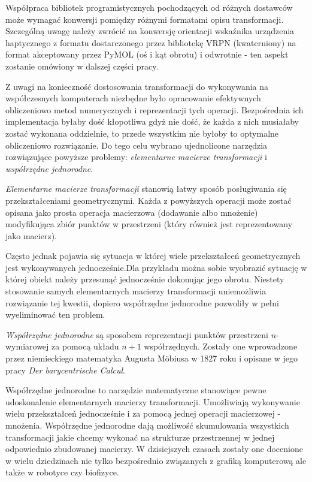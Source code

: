 \documentclass[licencjacka]{pracamgr}
\begin{document}
Współpraca bibliotek programistycznych pochodzących od różnych dostawców może wymagać konwersji pomiędzy różnymi formatami opisu transformacji. Szczególną uwagę należy zwrócić na konwersję orientacji wskaźnika urządzenia haptycznego z formatu dostarczonego przez bibliotekę VRPN (kwaterniony) na format akceptowany przez PyMOL (oś i kąt obrotu) i odwrotnie - ten aspekt zostanie omówiony w dalszej części pracy.

Z uwagi na konieczność dostosowania transformacji do wykonywania na współczesnych komputerach niezbędne było opracowanie efektywnych obliczeniowo metod numerycznych i reprezentacji tych operacji. Bezpośrednia ich implementacja byłaby dość kłopotliwa gdyż nie dość, że każda z nich musiałaby zostać wykonana oddzielnie, to przede wszystkim nie byłoby to optymalne obliczeniowo rozwiązanie. Do tego celu wybrano ujednolicone narzędzia rozwiązujące powyższe problemy: \textit{elementarne macierze transformacji} i \textit{współrzędne jednorodne}.

\textit{Elementarne macierze transformacji} stanowią łatwy sposób posługiwania się przekształceniami geometrycznymi. Każda z powyższych operacji może zostać opisana jako prosta operacja macierzowa (dodawanie albo mnożenie) modyfikująca zbiór punktów w przestrzeni (który również jest reprezentowany jako macierz). %


Często jednak pojawia się sytuacja w której wiele przekształceń geometrycznych jest wykonywanych jednocześnie.Dla przykładu można sobie wyobrazić sytuację w której obiekt należy przesunąć jednocześnie dokonując jego obrotu. Niestety stosowanie samych elementarnych macierzy transformacji uniemożliwia rozwiązanie tej kwestii, dopiero współrzędne jednorodne pozwoliły w pełni wyeliminować ten problem.

\textit{Współrzędne jednorodne} są sposobem reprezentacji punktów przestrzeni $n$-wymiarowej za pomocą układu $n+1$ współrzędnych. Zostały one wprowadzone przez niemieckiego matematyka Augusta Möbiusa w 1827 roku i opisane w jego pracy \textit{Der barycentrische Calcul}. 

Współrzędne jednorodne to narzędzie matematyczne stanowiące pewne udoskonalenie elementarnych macierzy transformacji. Umożliwiają wykonywanie wielu przekształceń jednocześnie i za pomocą jednej operacji macierzowej - mnożenia. Współrzędne jednorodne dają możliwość skumulowania wszystkich transformacji jakie chcemy wykonać na strukturze przestrzennej w jednej odpowiednio zbudowanej macierzy. W dzisiejszych czasach zostały one docenione w wielu dziedzinach nie tylko bezpośrednio związanych z grafiką komputerową ale także w robotyce czy biofizyce.
\end{document}
